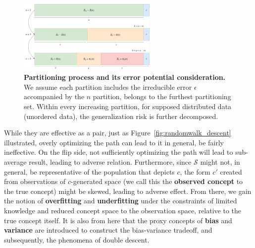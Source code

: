 \documentclass[twoside,10pt]{article}
\begin{document}

\begin{figure}
  \includegraphics[width=0.6\textwidth]{mamamia.png}
  \caption{\textbf{Partitioning process and its error potential consideration.} We assume each partition includes the irreducible error $\epsilon$ accompanied by the $n$ partition, belongs to the furthest partitioning set. Within every increasing partition, for supposed distributed data (unordered data), the generalization risk is further decomposed.}
\end{figure}

While they are effective as a pair, just as Figure~\ref{fig:randomwalk_descent} illustrated, overly optimizing the path can lead to it in general, be fairly ineffective. On the flip side, not sufficiently optimizing the path will lead to sub-average result, leading to adverse relation. Furthermore, since $\mathcal{S}$ might not, in general, be representative of the population that depicts $c$, the form $c'$ created from observations of $c$-generated space (we call this the \textbf{observed concept} to the true concept) might be skewed, leading to adverse effect. From there, we gain the notion of \textbf{overfitting} and \textbf{underfitting} under the constraints of limited knowledge and reduced concept space to the observation space, relative to the true concept itself. It is also from here that the proxy concepts of \textbf{bias} and \textbf{variance} are introduced to construct the bias-variance tradeoff, and subsequently, the phenomena of double descent. 
\end{document}
